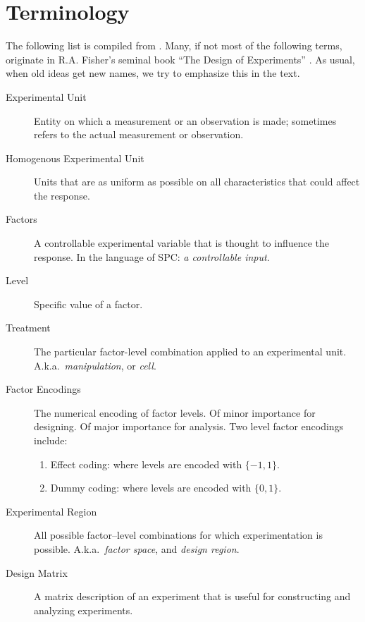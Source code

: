 \documentclass[12pt,a4paper]{report}
\theoremstyle{plain}
\theoremstyle{definition}
\newcommand{\set}[1]{\{ #1 \}} \newcommand{\setII}[1]{\left\{ #1 \right\}} \newcommand{\rv}[1]{\mathbf{#1}} \newcommand{\x}{\rv x} \newcommand{\y}{\rv y} \newcommand{\U}{\rv u} \newcommand{\T}{\rv t} \newcommand{\X}{\rv X} \newcommand{\Y}{\rv Y} \newcommand{\expect}[1]{\mathbf{E}\left[ #1 \right]} \newcommand{\expectg}[2]{\mathbf{E}_{\rv{#1}}\left[ \rv{#2} \right]} \newcommand{\expectn}[1]{\mathbb{E}\left[#1\right]} \newcommand{\cov}[1]{\mathbf{Cov} \left[ #1 \right]} \newcommand{\var}[1]{\mathop{Var} \left[ #1 \right]} \newcommand{\covn}[1]{\mathbb{Cov} \left[ #1 \right]} \newcommand{\gauss}[1]{\mathcal{N}\left(#1\right)} \newcommand{\cdf}[2]{F_{#1} (#2)} \newcommand{\survive}[2]{S_{#1} (#2)} \newcommand{\hazard}[2]{h_{#1} (#2)} \newcommand{\cuhazard}[2]{H_{#1} (#2)} \newcommand{\cdfn}[2]{\mathbb{F}_{#1}(#2)} \newcommand{\icdf}[2]{F_\rv{#1}^{-1} (#2)} \newcommand{\icdfn}[2]{\mathbb{F}^{-1}_{#1}(#2)} \newcommand{\pdf}[2]{p_{#1} (#2)} \newcommand{\prob}[1]{P\left( #1 \right)} \newcommand{\dist}{P} \newcommand{\density}{p}
\newcommand{\Aka}{{A.k.a.\ }}
\begin{document}
\section{Terminology}
The following list is compiled from \cite{mason_statistical_2003}. Many, if not most of the following terms, originate in R.A. Fisher's seminal book ``The Design of Experiments'' \citep{fisher_design_1960}. As usual, when old ideas get new names, we try to emphasize this in the text.



\begin{description}

\item [Experimental Unit]  Entity on which a measurement or an observation is made;
sometimes refers to the actual measurement or observation.
\item [Homogenous Experimental Unit] Units that are as uniform as possible on all characteristics that could affect the response.

\item [Factors]  A controllable experimental variable that is thought to influence the response. In the language of SPC: \emph{a controllable input}.

\item [Level] Specific value of a factor.

\item[Treatment] The particular factor-level combination applied to an experimental unit. \Aka \emph{manipulation}, or \emph{cell}.

\item [Factor Encodings] The numerical encoding of factor levels.
Of minor importance for designing. Of major importance for analysis.
Two level factor encodings include:
\begin{enumerate}
\item Effect coding: where levels are encoded with $\set{-1,1}$.
\item Dummy coding: where levels are encoded with $\set{0,1}$.
\end{enumerate}

\item [Experimental Region] All possible factor–level combinations for which experimentation is possible. \Aka \emph{factor space}, and \emph{design region}.

\item [Design Matrix] A matrix description of an experiment that is useful for constructing and analyzing experiments.


\end{description}
\end{document}
